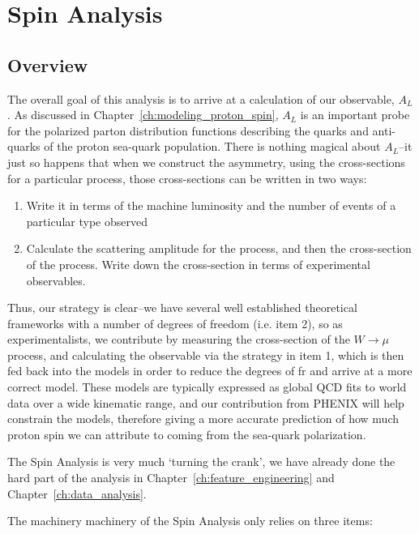 \chapter{Spin Analysis}
\label{ch:spin_analysis}
\section{Overview}

\edithere{}

The overall goal of this analysis is to arrive at a calculation of our
observable, $A_L$. As discussed in Chapter~\ref{ch:modeling_proton_spin}, $A_L$
is an important probe for the polarized parton distribution functions describing
the quarks and anti-quarks of the proton sea-quark population. There is nothing
magical about $A_L$--it just so happens that when we construct the asymmetry,
using the cross-sections for a particular process, those cross-sections can be
written in two ways:

\begin{enumerate}
  \item Write it in terms of the machine luminosity and the number of events of
    a particular type observed
  \item Calculate the scattering amplitude for the process, and then the
    cross-section of the process. Write down the cross-section in terms of
    experimental observables.
\end{enumerate}

Thus, our strategy is clear--we have several well established theoretical
frameworks with a number of degrees of freedom (i.e. item 2), so as
experimentalists, we contribute by measuring the cross-section of the
$W\rightarrow\mu$ process, and calculating the observable via the strategy in
item 1, which is then fed back into the models in order to reduce the degrees of
fr and arrive at a more correct model. These models are typically expressed as
global QCD fits to world data over a wide kinematic range, and our contribution
from PHENIX will help constrain the models, therefore giving a more accurate
prediction of how much proton spin we can attribute to coming from the sea-quark
polarization.

The Spin Analysis is very much `turning the crank', we have already done the
hard part of the analysis in Chapter~\ref{ch:feature_engineering} and
Chapter~\ref{ch:data_analysis}. 

{\noindent}The machinery machinery of the Spin Analysis only relies on three items:

